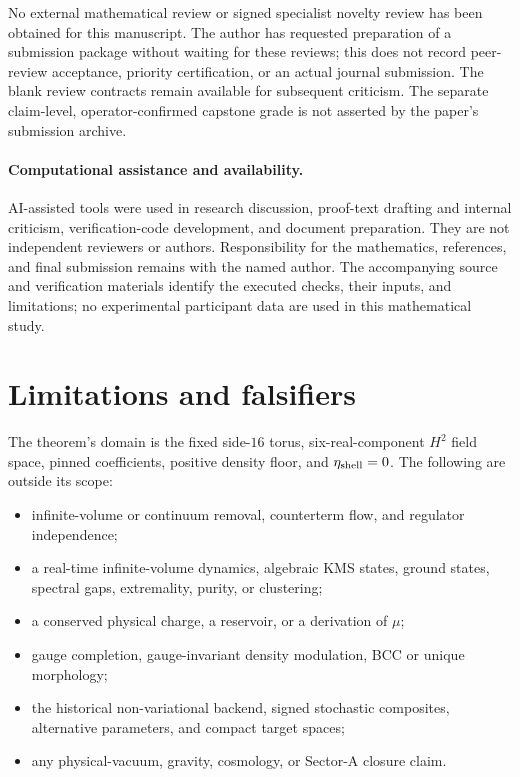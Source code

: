 \documentclass[11pt]{article}
\numberwithin{equation}{section}
\theoremstyle{definition}
\begin{document}
No external mathematical review or signed specialist novelty review has been
obtained for this manuscript.  The author has requested preparation of a
submission package without waiting for these reviews; this does not record
peer-review acceptance, priority certification, or an actual journal submission.
The blank review contracts remain available for subsequent criticism.  The
separate claim-level, operator-confirmed capstone grade is not asserted by
the paper's submission archive.

\paragraph{Computational assistance and availability.}
AI-assisted tools were used in research discussion, proof-text drafting and
internal criticism, verification-code development, and document preparation.
They are not independent reviewers or authors.  Responsibility for the
mathematics, references, and final submission remains with the named author.
The accompanying source and verification materials identify the executed
checks, their inputs, and limitations; no experimental participant data are
used in this mathematical study.

\section{Limitations and falsifiers}
\label{sec:limitations}

The theorem's domain is the fixed side-$16$ torus, six-real-component $H^2$
field space, pinned coefficients, positive density floor, and $\eta_{\rm
shell}=0$.  The following are outside its scope:
\begin{itemize}
\item infinite-volume or continuum removal, counterterm flow, and regulator
      independence;
\item a real-time infinite-volume dynamics, algebraic KMS states, ground
      states, spectral gaps, extremality, purity, or clustering;
\item a conserved physical charge, a reservoir, or a derivation of $\mu$;
\item gauge completion, gauge-invariant density modulation, BCC or unique
      morphology;
\item the historical non-variational backend, signed stochastic composites,
      alternative parameters, and compact target spaces;
\item any physical-vacuum, gravity, cosmology, or Sector-A closure claim.
\end{itemize}
\end{document}
